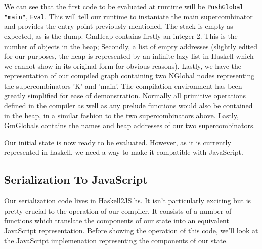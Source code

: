 \noindent We can see that the first code to be evaluated at 
runtime will be 
\verb!PushGlobal! \verb!"main"!, \verb!Eval!. 
This will tell our runtime
to instaniate the main supercombinator and provides the entry
point previously mentioned. The stack is empty as expected,
as is the dump. GmHeap contains firstly an integer 2. This 
is the number of objects in the heap; Secondly, a list of
empty addresses (slightly edited for our purposes, the heap 
is represented by an infinite lazy list in Haskell which we
cannot show in its original form for obvious reasons). Lastly,
we have the representation of our compiled graph containing two
NGlobal nodes representing the supercombinators 'K' and 'main'.
The compilation environment has been greatly simplified for
ease of demonstration. Normally all primitive operations 
defined in the compiler as well as any prelude functions would
also be contained in the heap, in a similar fashion to the
two supercombinators above. Lastly, GmGlobals contains the
names and heap addresses of our two supercombinators.

Our initial state is now ready to be evaluated. However, as
it is currently represented in haskell, we need a way to make
it compatible with JavaScript. 

\subsection{Serialization To JavaScript}
Our serialization code lives in Haskell2JS.hs. It isn't 
particularly exciting but is pretty crucial to the operation
of our compiler. It consists of a number of functions which
translate the components of our state into an equivalent
JavaScript representation. Before showing the operation
of this code, we'll look at the JavaScript implemenation
representing the components of our state.

